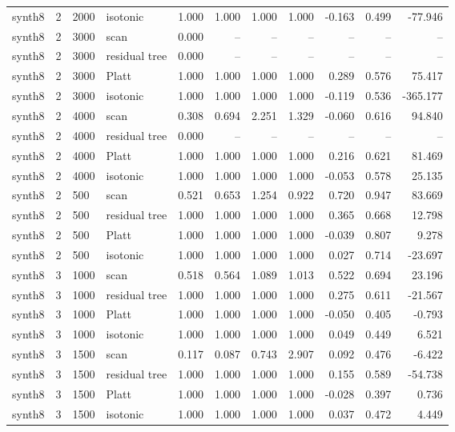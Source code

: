 \begin{tabular}{lrllrrrrrrr}
synth8 & 2 & 2000 & isotonic & 1.000 & 1.000 & 1.000 & 1.000 & -0.163 & 0.499 & -77.946 \\
synth8 & 2 & 3000 & scan & 0.000 & -- & -- & -- & -- & -- & -- \\
synth8 & 2 & 3000 & residual tree & 0.000 & -- & -- & -- & -- & -- & -- \\
synth8 & 2 & 3000 & Platt & 1.000 & 1.000 & 1.000 & 1.000 & 0.289 & 0.576 & 75.417 \\
synth8 & 2 & 3000 & isotonic & 1.000 & 1.000 & 1.000 & 1.000 & -0.119 & 0.536 & -365.177 \\
synth8 & 2 & 4000 & scan & 0.308 & 0.694 & 2.251 & 1.329 & -0.060 & 0.616 & 94.840 \\
synth8 & 2 & 4000 & residual tree & 0.000 & -- & -- & -- & -- & -- & -- \\
synth8 & 2 & 4000 & Platt & 1.000 & 1.000 & 1.000 & 1.000 & 0.216 & 0.621 & 81.469 \\
synth8 & 2 & 4000 & isotonic & 1.000 & 1.000 & 1.000 & 1.000 & -0.053 & 0.578 & 25.135 \\
synth8 & 2 & 500 & scan & 0.521 & 0.653 & 1.254 & 0.922 & 0.720 & 0.947 & 83.669 \\
synth8 & 2 & 500 & residual tree & 1.000 & 1.000 & 1.000 & 1.000 & 0.365 & 0.668 & 12.798 \\
synth8 & 2 & 500 & Platt & 1.000 & 1.000 & 1.000 & 1.000 & -0.039 & 0.807 & 9.278 \\
synth8 & 2 & 500 & isotonic & 1.000 & 1.000 & 1.000 & 1.000 & 0.027 & 0.714 & -23.697 \\
synth8 & 3 & 1000 & scan & 0.518 & 0.564 & 1.089 & 1.013 & 0.522 & 0.694 & 23.196 \\
synth8 & 3 & 1000 & residual tree & 1.000 & 1.000 & 1.000 & 1.000 & 0.275 & 0.611 & -21.567 \\
synth8 & 3 & 1000 & Platt & 1.000 & 1.000 & 1.000 & 1.000 & -0.050 & 0.405 & -0.793 \\
synth8 & 3 & 1000 & isotonic & 1.000 & 1.000 & 1.000 & 1.000 & 0.049 & 0.449 & 6.521 \\
synth8 & 3 & 1500 & scan & 0.117 & 0.087 & 0.743 & 2.907 & 0.092 & 0.476 & -6.422 \\
synth8 & 3 & 1500 & residual tree & 1.000 & 1.000 & 1.000 & 1.000 & 0.155 & 0.589 & -54.738 \\
synth8 & 3 & 1500 & Platt & 1.000 & 1.000 & 1.000 & 1.000 & -0.028 & 0.397 & 0.736 \\
synth8 & 3 & 1500 & isotonic & 1.000 & 1.000 & 1.000 & 1.000 & 0.037 & 0.472 & 4.449 \\

\end{tabular}
